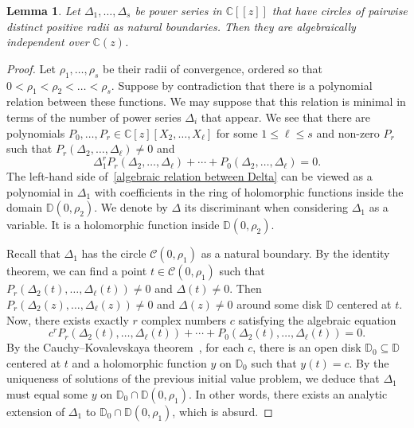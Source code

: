 \documentclass[11pt,a4paper]{article}
\theoremstyle{plain}
\newtheorem{lemma}[theorem]{Lemma}
\theoremstyle{remark}
\theoremstyle{custombold}
\begin{document}
\begin{lemma}
    Let $\Delta_1,\ldots,\Delta_s$ be power series in $\mathbb C[[z]]$ that have circles of pairwise distinct positive radii as natural boundaries. Then they are algebraically independent over $\mathbb C(z)$.
\end{lemma}
\begin{proof}
    Let $\rho_1,\ldots,\rho_s$ be their radii of convergence, ordered so that $0<\rho_1<\rho_2<\ldots<\rho_s$. Suppose by contradiction that there is a polynomial relation between these functions. We may suppose that this relation is minimal in terms of the number of power series $\Delta_i$ that appear. We see that
    there are polynomials $P_0,\ldots,P_r\in\mathbb C[z][X_2,\ldots,X_\ell]$ for some $1\leq \ell\leq s$ and non-zero $P_r$ such that $P_r(\Delta_2,\ldots,\Delta_\ell)\neq0$ and
    \begin{equation}\label{algebraic relation between Delta}
\Delta_1^rP_r(\Delta_2,\ldots,\Delta_\ell)+\cdots+P_0(\Delta_2,\ldots,\Delta_\ell)=0.
    \end{equation}
    The left-hand side of~\eqref{algebraic relation between Delta} can be viewed as a polynomial in $\Delta_1$ with coefficients in the ring of holomorphic functions inside the domain $\mathbb D(0,\rho_2)$. We denote by $\Delta$ its discriminant when considering $\Delta_1$ as a variable. It is a holomorphic function inside $\mathbb D(0,\rho_2)$.
    
    Recall that $\Delta_1$ has the circle $\mathcal{C}(0,\rho_1)$ as a natural boundary. By the identity theorem, we can find a point $t\in\mathcal{C}(0,\rho_1)$ such that $P_r(\Delta_2(t),\ldots,\Delta_\ell(t))\neq0$ and $\Delta(t)\neq0$. Then $P_r(\Delta_2(z),\ldots,\Delta_\ell(z))\neq0$ and $\Delta(z)\neq0$ around some disk $\mathbb D$ centered at $t$. Now, there exists exactly $r$ complex numbers $c$ satisfying the algebraic equation $$c^rP_r(\Delta_2(t),\ldots,\Delta_\ell(t))+\cdots+P_0(\Delta_2(t),\ldots,\Delta_\ell(t))=0.$$
By the Cauchy--Kovalevskaya theorem~\cite[Theorem~9.4.8]{Hormander-book-1983}, for each $c$, there is an open disk $\mathbb D_0\subseteq\mathbb D$ centered at $t$ and a holomorphic function $y$ on $\mathbb D_0$ such that $y(t)=c$. By the uniqueness of solutions of the previous initial value problem, we deduce that $\Delta_1$ must equal some $y$ on $\mathbb D_0\cap \mathbb D(0,\rho_1)$. In other words, there exists an analytic extension of $\Delta_1$ to $\mathbb D_0\cap \mathbb D(0,\rho_1)$, which is absurd. 
\end{proof}
 
\end{document}

